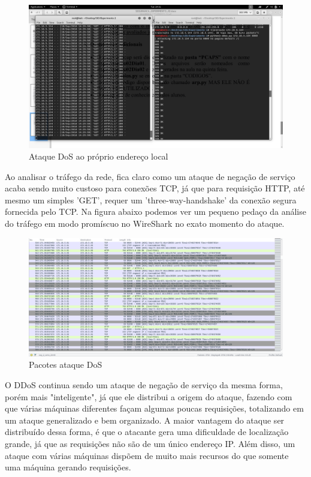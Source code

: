 \documentclass[journal]{IEEEtran}
\begin{document}
\begin{figure}[h!]
	\includegraphics[width=\linewidth]{../fotos_experimento_2/atacandoLocalhost.png}
	\caption{Ataque DoS ao próprio endereço local}
	\label{fig:Ataque_a_si}
\end{figure}

Ao analisar o tráfego da rede, fica claro como um ataque de negação de serviço acaba sendo muito custoso para conexões TCP, já que para requisição HTTP, até mesmo um simples 'GET', requer um 'three-way-handshake' da conexão segura fornecida pelo TCP. Na figura abaixo podemos ver um pequeno pedaço da análise do tráfego em modo promíscuo no WireShark no exato momento do ataque.

\begin{figure}[h!]
	\includegraphics[width=\linewidth]{../fotos_experimento_2/pacotes_DoS_TCP_HTTP.png}
	\caption{Pacotes ataque DoS}
	\label{fig:Pacotes_ataque}
\end{figure}

O DDoS continua sendo um ataque de negação de serviço da mesma forma, porém mais "inteligente", já que ele distribui a origem do ataque, fazendo com que várias máquinas diferentes façam algumas poucas requisições, totalizando em um ataque generalizado e bem organizado. A maior vantagem do ataque ser distribuído dessa forma, é que o atacante gera uma dificuldade de localização grande, já que as requisições não são de um único endereço IP. Além disso, um ataque com várias máquinas dispõem de muito mais recursos do que somente uma máquina gerando requisições.
\end{document}
